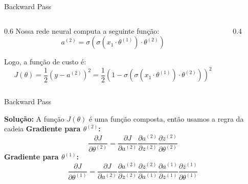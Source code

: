 \documentclass[aspectratio=169, xcolor=dvipsnames]{beamer}
\begin{document}
  \begin{frame}{Backward Pass}
    \vspace{5pt}
    \begin{figure}
      \centering
      
    \end{figure}
    \vspace{10pt}
    \begin{columns}
      \begin{column}{0.6\textwidth}
        Nossa rede neural computa a seguinte função:
        \[
          a^{(2)}= \sigma(\sigma(x_{1}\cdot \theta^{(1)})\cdot \theta^{(2)})
        \]

        Logo, a função de custo é:
        \[
          J(\theta)=\frac{1}{2}(y-a^{(2)})^{2}=\frac{1}{2}\left(1-\sigma\left(\sigma
          ( x_{1}\cdot \theta^{(1)})\cdot \theta^{(2)}\right)\right)^{2}
        \]
      \end{column}
      \begin{column}{0.4\textwidth}
        \vfill
      \end{column}
    \end{columns}
  \end{frame}

  \begin{frame}{Backward Pass}
    \vspace{5pt}
    \begin{figure}
      \centering
      
    \end{figure}
    \vspace{10pt}

    \textbf{Solução:} A função $J(\theta)$ é uma função composta, então usamos a
    regra da cadeia
    \vfill
    \textbf{Gradiente para $\theta^{(2)}$:}
    \[
      \frac{\partial J}{\partial\theta^{(2)}}=\frac{\partial J}{\partial a^{(2)}}
      \frac{\partial a^{(2)}}{\partial z^{(2)}}\frac{\partial z^{(2)}}{\partial\theta^{(2)}}
    \]
    \vfill
    \textbf{Gradiente para $\theta^{(1)}$:}
    \[
      \frac{\partial J}{\partial\theta^{(1)}}=\frac{\partial J}{\partial a^{(2)}}
      \frac{\partial a^{(2)}}{\partial z^{(2)}}\frac{\partial z^{(2)}}{\partial
      a^{(1)}}\frac{\partial a^{(1)}}{\partial z^{(1)}}\frac{\partial z^{(1)}}{\partial\theta^{(1)}}
    \]
  \end{frame}
\end{document}
